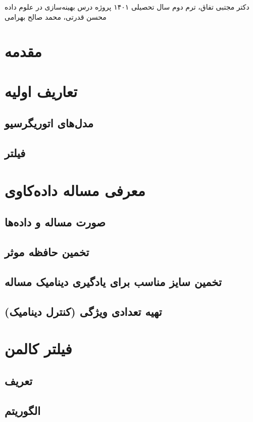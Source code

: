 \documentclass{scribe-cgenomics}
\begin{document}
{دکتر مجتبی تفاق، ترم دوم سال تحصیلی ۱۴۰۱}
{پروژه درس بهینه‌سازی در علوم داده}
{محسن قدرتی، محمد صالح بهرامی}


\section{مقدمه}


\section{تعاریف اولیه}
\subsection{مدل‌های اتوریگرسیو}
\subsection{فیلتر}


\section{معرفی مساله داده‌کاوی}
\subsection{صورت مساله و داده‌ها}
\subsection{تخمین حافظه موثر}
\subsection{تخمین سایز مناسب برای یادگیری دینامیک مساله}
\subsection{تهیه تعدادی ویژگی (کنترل دینامیک)}


\section{فیلتر کالمن}
\subsection{تعریف}

\subsection{الگوریتم}
\end{document}
